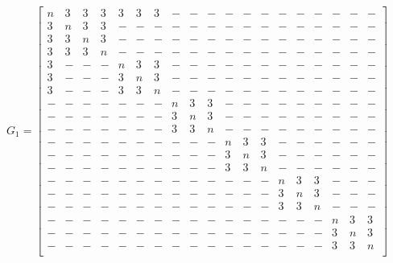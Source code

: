 \[G_1 = \left[\begin{smallmatrix}
n&3&3&3&3&3&3&-&-&-&-&-&-&-&-&-&-&-&-\\
3&n&3&3&-&-&-&-&-&-&-&-&-&-&-&-&-&-&-\\
3&3&n&3&-&-&-&-&-&-&-&-&-&-&-&-&-&-&-\\
3&3&3&n&-&-&-&-&-&-&-&-&-&-&-&-&-&-&-\\
3&-&-&-&n&3&3&-&-&-&-&-&-&-&-&-&-&-&-\\
3&-&-&-&3&n&3&-&-&-&-&-&-&-&-&-&-&-&-\\
3&-&-&-&3&3&n&-&-&-&-&-&-&-&-&-&-&-&-\\
-&-&-&-&-&-&-&n&3&3&-&-&-&-&-&-&-&-&-\\
-&-&-&-&-&-&-&3&n&3&-&-&-&-&-&-&-&-&-\\
-&-&-&-&-&-&-&3&3&n&-&-&-&-&-&-&-&-&-\\
-&-&-&-&-&-&-&-&-&-&n&3&3&-&-&-&-&-&-\\
-&-&-&-&-&-&-&-&-&-&3&n&3&-&-&-&-&-&-\\
-&-&-&-&-&-&-&-&-&-&3&3&n&-&-&-&-&-&-\\
-&-&-&-&-&-&-&-&-&-&-&-&-&n&3&3&-&-&-\\
-&-&-&-&-&-&-&-&-&-&-&-&-&3&n&3&-&-&-\\
-&-&-&-&-&-&-&-&-&-&-&-&-&3&3&n&-&-&-\\
-&-&-&-&-&-&-&-&-&-&-&-&-&-&-&-&n&3&3\\
-&-&-&-&-&-&-&-&-&-&-&-&-&-&-&-&3&n&3\\
-&-&-&-&-&-&-&-&-&-&-&-&-&-&-&-&3&3&n\\
\end{smallmatrix}\right]\]
